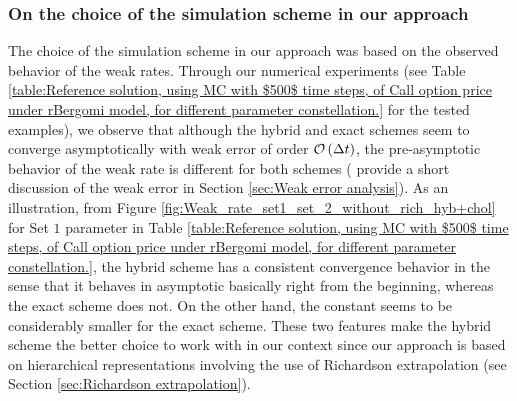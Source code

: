 \subsubsection{On the choice of the simulation scheme in our approach}\label{sec: choice of simulation scheme}
The choice of the simulation scheme in our approach was based on the observed behavior of the weak rates. Through our numerical experiments (see Table \ref{table:Reference solution, using MC with $500$ time steps, of Call option price under rBergomi model, for different parameter constellation.} for the tested examples), we observe that although the hybrid and exact schemes  seem to converge asymptotically with weak error of order ${\mathcal{O}}\left(\Delta t\right)$, the pre-asymptotic behavior of the weak rate is different for both schemes ( provide a short discussion of the weak error in Section \ref{sec:Weak error analysis}). As an illustration, from Figure \ref{fig:Weak_rate_set1_set_2_without_rich_hyb+chol} for Set $1$ parameter in Table \ref{table:Reference solution, using MC with $500$ time steps, of Call option price under rBergomi model, for different parameter constellation.}, the hybrid scheme  has a consistent convergence behavior in the sense that it behaves in  asymptotic  basically right from the beginning, whereas the exact scheme does not. On the other hand, the constant  seems to be considerably smaller for the exact scheme. These two features make the hybrid scheme the  better choice   to work with in our context since our approach is based on hierarchical representations involving the use of Richardson extrapolation (see Section \ref{sec:Richardson extrapolation}).
\FloatBarrier
